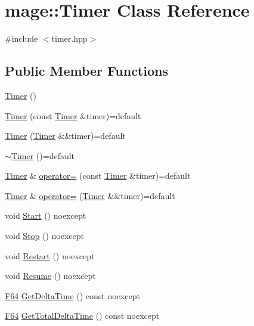 \hypertarget{classmage_1_1_timer}{}\section{mage\+:\+:Timer Class Reference}
\label{classmage_1_1_timer}


{\ttfamily \#include $<$timer.\+hpp$>$}

\subsection*{Public Member Functions}
\begin{DoxyCompactItemize}
\item 
\hyperlink{classmage_1_1_timer_a5e1c0a3bb4491b3a43ce05874ad24055}{Timer} ()
\item 
\hyperlink{classmage_1_1_timer_a5a1e05fde40a44cd9434572712142c23}{Timer} (const \hyperlink{classmage_1_1_timer}{Timer} \&timer)=default
\item 
\hyperlink{classmage_1_1_timer_a5fb4b89725b16e0d4b1fbae2f95f30cb}{Timer} (\hyperlink{classmage_1_1_timer}{Timer} \&\&timer)=default
\item 
\hyperlink{classmage_1_1_timer_a66d6964a6d42eef72f7312f1233e4f74}{$\sim$\+Timer} ()=default
\item 
\hyperlink{classmage_1_1_timer}{Timer} \& \hyperlink{classmage_1_1_timer_ae83df63d5ff9eec370eddf208ac2077e}{operator=} (const \hyperlink{classmage_1_1_timer}{Timer} \&timer)=default
\item 
\hyperlink{classmage_1_1_timer}{Timer} \& \hyperlink{classmage_1_1_timer_a93f3a9d730bebd189af904568e5b7ecd}{operator=} (\hyperlink{classmage_1_1_timer}{Timer} \&\&timer)=default
\item 
void \hyperlink{classmage_1_1_timer_a60e9e329f1e71a6e25351ff6dbcc1b92}{Start} () noexcept
\item 
void \hyperlink{classmage_1_1_timer_aa880e02bfeea2d082a5f34e497bd6500}{Stop} () noexcept
\item 
void \hyperlink{classmage_1_1_timer_a47e6893e733911624ebf54d5f88cd3fd}{Restart} () noexcept
\item 
void \hyperlink{classmage_1_1_timer_ab3cfad4fd61d52852181f7a060069892}{Resume} () noexcept
\item 
\hyperlink{namespacemage_ad26233bbec640deda836e572c1a23708}{F64} \hyperlink{classmage_1_1_timer_a49d36d6d60530a55af210abd01577365}{Get\+Delta\+Time} () const noexcept
\item 
\hyperlink{namespacemage_ad26233bbec640deda836e572c1a23708}{F64} \hyperlink{classmage_1_1_timer_a21ee76bc048a3c80f1bfbbbd807e97a7}{Get\+Total\+Delta\+Time} () const noexcept
\end{DoxyCompactItemize}
